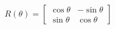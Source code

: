 \begin{equation}[H]
    R(\theta)=\left[\begin{array}{cc}
    \cos \theta & -\sin \theta \\
    \sin \theta & \cos \theta
    \end{array}\right]
    \label{equations:vector_rotation}
\end{equation}
